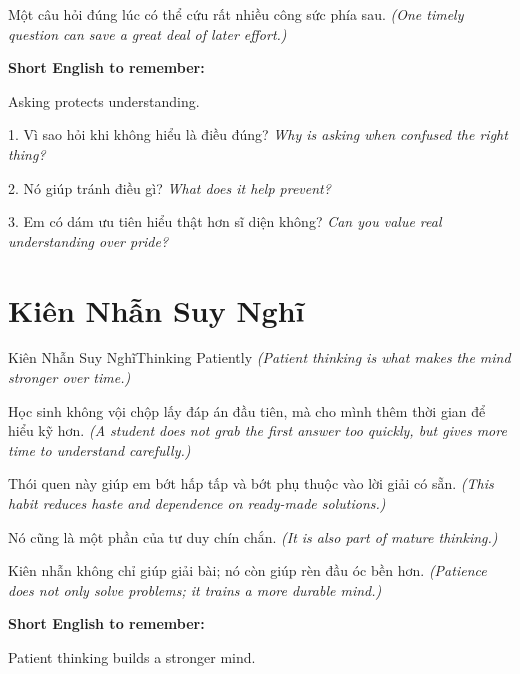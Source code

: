 \begin{baihoc}
Một câu hỏi đúng lúc có thể cứu rất nhiều công sức phía sau.
\textit{(One timely question can save a great deal of later effort.)}
\end{baihoc}

\begin{ghinhoanh}
\textbf{Short English to remember:}

Asking protects understanding.

\end{ghinhoanh}

\begin{tuhocnhanh}
1. Vì sao hỏi khi không hiểu là điều đúng? \textit{Why is asking when confused the right thing?}

2. Nó giúp tránh điều gì? \textit{What does it help prevent?}

3. Em có dám ưu tiên hiểu thật hơn sĩ diện không? \textit{Can you value real understanding over pride?}
\end{tuhocnhanh}
\ngancach

\section{Kiên Nhẫn Suy Nghĩ}
\begin{truyen}{Kiên Nhẫn Suy Nghĩ}{Thinking Patiently}
\textit{(Patient thinking is what makes the mind stronger over time.)}

Học sinh không vội chộp lấy đáp án đầu tiên, mà cho mình thêm thời gian để hiểu kỹ hơn.
\textit{(A student does not grab the first answer too quickly, but gives more time to understand carefully.)}

Thói quen này giúp em bớt hấp tấp và bớt phụ thuộc vào lời giải có sẵn.
\textit{(This habit reduces haste and dependence on ready-made solutions.)}

Nó cũng là một phần của tư duy chín chắn.
\textit{(It is also part of mature thinking.)}
\end{truyen}

\begin{baihoc}
Kiên nhẫn không chỉ giúp giải bài; nó còn giúp rèn đầu óc bền hơn.
\textit{(Patience does not only solve problems; it trains a more durable mind.)}
\end{baihoc}

\begin{ghinhoanh}
\textbf{Short English to remember:}

Patient thinking builds a stronger mind.

\end{ghinhoanh}


